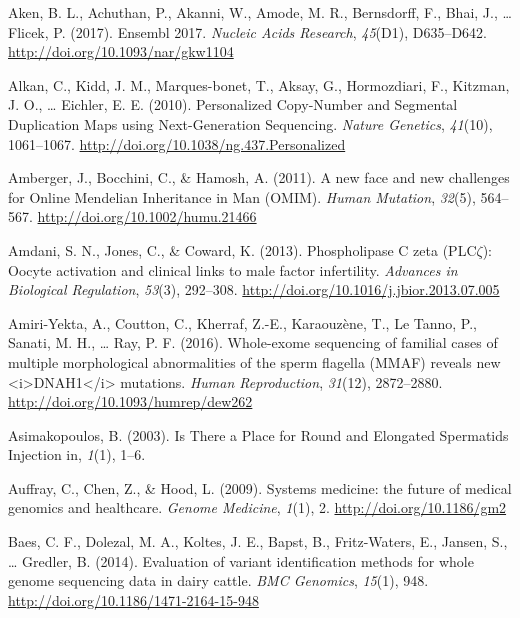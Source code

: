 \documentclass[12pt,twoside]{reedthesis}
\theoremstyle{definition}
\theoremstyle{definition}
\theoremstyle{remark}
\begin{document}
  \hypertarget{ref-Aken2017}{}
  Aken, B. L., Achuthan, P., Akanni, W., Amode, M. R., Bernsdorff, F.,
  Bhai, J., \ldots{} Flicek, P. (2017). Ensembl 2017. \emph{Nucleic Acids
  Research}, \emph{45}(D1), D635--D642.
  \url{http://doi.org/10.1093/nar/gkw1104}
  
  \hypertarget{ref-Alkan2010}{}
  Alkan, C., Kidd, J. M., Marques-bonet, T., Aksay, G., Hormozdiari, F.,
  Kitzman, J. O., \ldots{} Eichler, E. E. (2010). Personalized Copy-Number
  and Segmental Duplication Maps using Next-Generation Sequencing.
  \emph{Nature Genetics}, \emph{41}(10), 1061--1067.
  \url{http://doi.org/10.1038/ng.437.Personalized}
  
  \hypertarget{ref-Amberger2011}{}
  Amberger, J., Bocchini, C., \& Hamosh, A. (2011). A new face and new
  challenges for Online Mendelian Inheritance in Man (OMIM). \emph{Human
  Mutation}, \emph{32}(5), 564--567.
  \url{http://doi.org/10.1002/humu.21466}
  
  \hypertarget{ref-Amdani2013}{}
  Amdani, S. N., Jones, C., \& Coward, K. (2013). Phospholipase C zeta
  (PLC\(\zeta\)): Oocyte activation and clinical links to male factor
  infertility. \emph{Advances in Biological Regulation}, \emph{53}(3),
  292--308. \url{http://doi.org/10.1016/j.jbior.2013.07.005}
  
  \hypertarget{ref-Amiri-Yekta2016}{}
  Amiri-Yekta, A., Coutton, C., Kherraf, Z.-E., Karaouzène, T., Le Tanno,
  P., Sanati, M. H., \ldots{} Ray, P. F. (2016). Whole-exome sequencing of
  familial cases of multiple morphological abnormalities of the sperm
  flagella (MMAF) reveals new
  \textless{}i\textgreater{}DNAH1\textless{}/i\textgreater{} mutations.
  \emph{Human Reproduction}, \emph{31}(12), 2872--2880.
  \url{http://doi.org/10.1093/humrep/dew262}
  
  \hypertarget{ref-Asimakopoulos2003}{}
  Asimakopoulos, B. (2003). Is There a Place for Round and Elongated
  Spermatids Injection in, \emph{1}(1), 1--6.
  
  \hypertarget{ref-Auffray2009}{}
  Auffray, C., Chen, Z., \& Hood, L. (2009). Systems medicine: the future
  of medical genomics and healthcare. \emph{Genome Medicine}, \emph{1}(1),
  2. \url{http://doi.org/10.1186/gm2}
  
  \hypertarget{ref-Baes2014}{}
  Baes, C. F., Dolezal, M. A., Koltes, J. E., Bapst, B., Fritz-Waters, E.,
  Jansen, S., \ldots{} Gredler, B. (2014). Evaluation of variant
  identification methods for whole genome sequencing data in dairy cattle.
  \emph{BMC Genomics}, \emph{15}(1), 948.
  \url{http://doi.org/10.1186/1471-2164-15-948}
  
\end{document}
